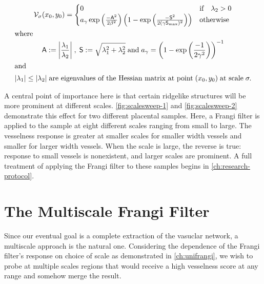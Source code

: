     \begin{gather} \label{eq:Vsigma}
    \Vsigma(x_0,y_0) = \begin{cases}
    0 & \text{if} \quad \lambda_2 > 0 \\
    a_\gamma \exp\left(\frac{-\Am^2}{2\beta^2}\right)
    \left(1 - \exp\left(\frac{-\Sm^2}{2(\gamma \Smax)^2}\right)\right) & \text{otherwise}
    \end{cases} \\
    \shortintertext{where}
    \Am := \abs*{\frac{\lambda_1}{\lambda_2}}
    \;,\;
    \Sm := \sqrt{\lambda_1^2 + \lambda_2^2}
    \;\textrm{and}\;
    a_\gamma = \left(1-\exp\left(\frac{-1}{2\gamma^2}\right)\right)^{-1} \notag\\
    \shortintertext{and}
    \abs*{\lambda_1} \le \abs*{\lambda_2}
    \; \textrm{are eigenvalues of the Hessian matrix at point} \; (x_0, y_0) \;\textrm{at scale}\; \sigma. \notag
    \end{gather}
    
    A central point of importance here is that certain ridgelike structures will be more prominent at different scales. \cref{fig:scalesweep-1} and \cref{fig:scalesweep-2} demonstrate this effect for two different placental samples. Here, a Frangi filter is applied to the sample at eight different scales ranging from small to large. The vesselness response is greater at smaller scales for smaller width vessels and smaller for larger width vessels. When the scale is large, the reverse is true: response to small vessels is nonexistent, and larger scales are prominent.  A full treatment of applying the Frangi filter to these samples begins in \cref{ch:research-protocol}.
    
    \section{The Multiscale Frangi Filter}
    Since our eventual goal is a complete extraction of the vasuclar network, a multiscale approach is the natural one. Considering the dependence of the Frangi filter's response on choice of scale as demonstrated in \cref{ch:unifrangi}, we wish to probe at multiple scales
   regions that would receive a high vesselness score at any range and somehow merge the result.
   
